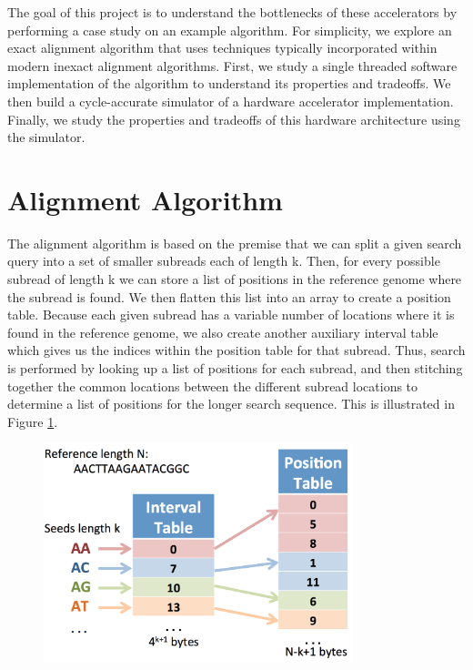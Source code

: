 \documentclass[11pt]{article}
\begin{document}
The goal of this project is to understand the bottlenecks of these accelerators by performing a case study on an example algorithm.  For simplicity, we explore an exact alignment algorithm that uses techniques typically incorporated within modern inexact alignment algorithms.  First, we study a single threaded software implementation of the algorithm to understand its properties and tradeoffs.  We then build a cycle-accurate simulator of a hardware accelerator implementation.  Finally, we study the properties and tradeoffs of this hardware architecture using the simulator.

\section{Alignment Algorithm}

The alignment algorithm is based on the premise that we can split a given search query into a set of smaller subreads each of length k. Then, for every possible subread of length k we can store a list of positions in the reference genome where the subread is found. We then flatten this list into an array to create a position table. Because each given subread has a variable number of locations where it is found in the reference genome, we also create another auxiliary interval table which gives us the indices within the position table for that subread. Thus, search is performed by looking up a list of positions for each subread, and then stitching together the common locations between the different subread locations to determine a list of positions for the longer search sequence.  This is illustrated in Figure \ref{algorithm}.
\begin{figure}[ht!]
\centering
\includegraphics[width=90mm]{algorithm.png}
\caption{}
\label{algorithm}
\end{figure}
\end{document}
